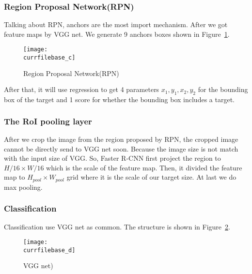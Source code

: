 \documentclass[catalog.tex]{subfiles}
\begin{document}
\subsubsection{Region Proposal Network(RPN)}
Talking about RPN, anchors are the most import mechanism. After we got feature maps by VGG net. We generate 9 anchors boxes shown in Figure~\ref{fig:\currfilebase_c}.
\begin{figure}[!htb]
\centering
\texttt{[image: \\currfilebase\_c]}
	\caption{Region Proposal Network(RPN)}
	\label{fig:\currfilebase_c}
\end{figure}
After that, it will use regression to get 4 parameters $x_1, y_1, x_2, y_2$ for the bounding box of the target and 1 score for whether the bounding box includes a target. 
\subsubsection{The RoI pooling layer}
After we crop the image from the region proposed by RPN, the cropped image cannot be directly send to VGG net soon. Because the image size is not match with the input size of VGG. So, Faster R-CNN first project the region to $H/16\times W/16$ which is the scale of the feature map. Then, it divided the feature map to $H_{pool}\times W_{pool}$ grid where it is the scale of our target size. At last we do max pooling.
\subsubsection{Classification}
Classification use VGG net as common. The structure is shown in Figure~\ref{fig:\currfilebase_d}.
\begin{figure}[!htb]
\centering
\texttt{[image: \\currfilebase\_d]}
	\caption{VGG net)}
	\label{fig:\currfilebase_d}
\end{figure}



\end{document}
